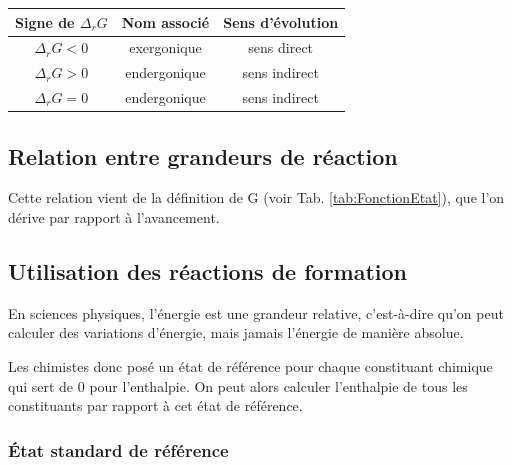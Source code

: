 \begin{minipage}{0.45\textwidth}
\centering
\begin{tabular}{ccc}
\toprule
Signe de $\Delta_r G$ & Nom associé & Sens d'évolution \\
\midrule
$\Delta_r G < 0$ & exergonique &  sens direct \ce{->} \\
$\Delta_r G > 0$ & endergonique &  sens indirect \ce{<-} \\
$\Delta_r G = 0$ & endergonique &  sens indirect \ce{<-} \\
\bottomrule
\end{tabular}
\end{minipage}\hfill\begin{minipage}{0.45\textwidth}
\end{minipage}

\subsection{Relation entre grandeurs de réaction}


Cette relation vient de la définition de G (voir Tab. \ref{tab:FonctionEtat}), que l'on dérive par rapport à l'avancement.

\subsection{Utilisation des réactions de formation}

En sciences physiques, l'énergie est une grandeur relative, c'est-à-dire qu'on peut calculer des variations d'énergie, mais jamais l'énergie de manière absolue.

Les chimistes donc posé un état de référence pour chaque constituant chimique qui sert de $0$ pour l'enthalpie. On peut alors calculer l'enthalpie de tous les constituants par rapport à cet état de référence.

\subsubsection{\'{E}tat standard de référence}

